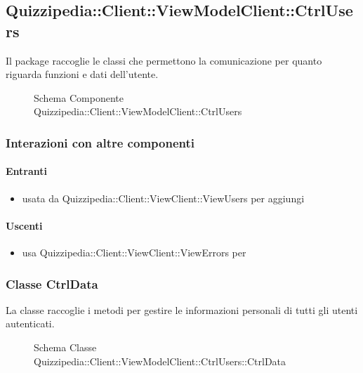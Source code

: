 \subsection{Quizzipedia::Client::ViewModelClient::CtrlUsers}
Il package raccoglie le classi che permettono la comunicazione per quanto riguarda funzioni e dati dell'utente.
\begin{figure}[H]
\centering
\noindent{}
\caption[Schema Componente Quizzipedia::Client::ViewModelClient::CtrlUsers]{Schema Componente Quizzipedia::Client::ViewModelClient::CtrlUsers}
\end{figure}
\subsubsection{Interazioni con altre componenti}
\paragraph{Entranti}
\begin{itemize}
\item usata da Quizzipedia::Client::ViewClient::ViewUsers per aggiungi
\end{itemize}
\paragraph{Uscenti}
\begin{itemize}
\item usa Quizzipedia::Client::ViewClient::ViewErrors per 
\end{itemize}
\subsubsection{Classe CtrlData}
La classe raccoglie i metodi per gestire le informazioni personali di tutti gli utenti autenticati.
\begin{figure}[H]
\centering
\noindent{}
\caption[Schema Classe CtrlData]{Schema Classe Quizzipedia::Client::ViewModelClient::CtrlUsers::CtrlData}
\end{figure}

